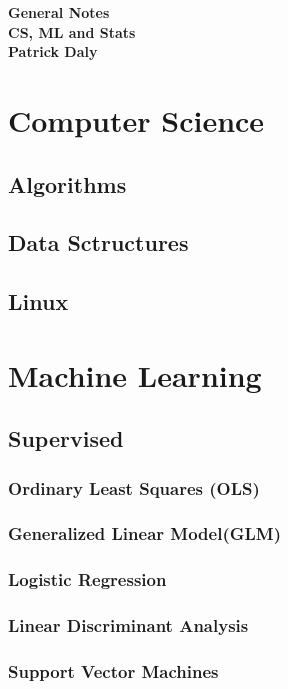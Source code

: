 \documentclass[11pt]{article}
\begin{document}
\begin{center}
  \vspace*{10mm}
  {\bf {\huge General Notes}}\\
  \vspace*{5mm}
  {\bf {CS, ML and Stats}
    \\ \vspace*{2mm} {\large Patrick Daly}
  }
\end{center}

\newpage

\tableofcontents
\newpage

\section{Computer Science}
\subsection{Algorithms}
\subsection{Data Sctructures}
\subsection{Linux}

\section{Machine Learning}
\subsection{Supervised}
\subsubsection{Ordinary Least Squares (OLS)}
\subsubsection{Generalized Linear Model(GLM)}
\subsubsection{Logistic Regression}
\subsubsection{Linear Discriminant Analysis}
\subsubsection{Support Vector Machines}
\end{document}
